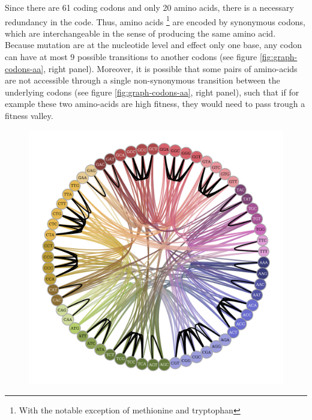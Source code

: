 Since there are 61 coding codons and only 20 amino acids, there is a necessary redundancy in the code.
Thus, amino acids \footnote{With the notable exception of methionine and tryptophan} are encoded by synonymous codons, which are interchangeable in the sense of producing the same amino acid.
Because mutation are at the nucleotide level and effect only one base, any codon can have at most $9$ possible transitions to another codons (see figure \ref{fig:graph-codons-aa}, right panel).
Moreover, it is possible that some pairs of amino-acids are not accessible through a single non-synonymous transition between the underlying codons (see figure \ref{fig:graph-codons-aa}, right panel), such that if for example these two amino-acids are high fitness, they would need to pass trough a fitness valley. 

\begin{figure}[htb!]
	\begin{center}
		\begin{minipage}{0.48\linewidth}
			\includegraphics[width=\linewidth, page=1]{figures/gt-codon-tab20b.pdf}
		\end{minipage}%
		\hfill
		\begin{minipage}{0.49\linewidth}

\end{minipage}
\end{center}
\end{figure}
